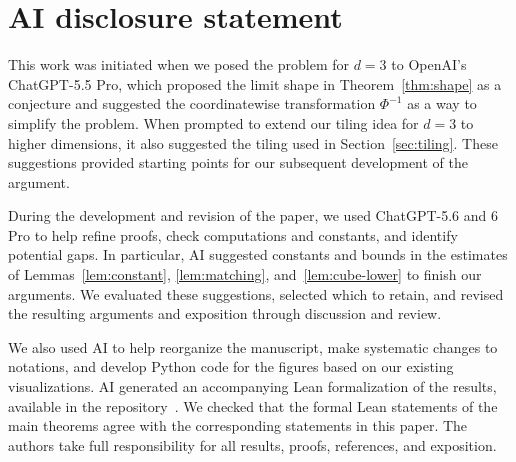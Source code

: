 \documentclass[11pt,letterpaper]{article}
\begin{document}
\section*{AI disclosure statement}\label{sec:ai}
This work was initiated when we posed the problem for $d=3$ to OpenAI's ChatGPT-5.5 Pro, which proposed the limit shape in Theorem~\ref{thm:shape} as a conjecture and suggested the coordinatewise transformation $\Phi^{-1}$ as a way to simplify the problem. When prompted to extend our tiling idea for $d=3$ to higher dimensions, it also suggested the tiling used in Section~\ref{sec:tiling}. These suggestions provided starting points for our subsequent development of the argument.

During the development and revision of the paper, we used ChatGPT-5.6 and 6 Pro to help refine proofs, check computations and constants, and identify potential gaps. In particular, AI suggested constants and bounds in the estimates of Lemmas~\ref{lem:constant}, \ref{lem:matching}, and~\ref{lem:cube-lower} to finish our arguments. We evaluated these suggestions, selected which to retain, and revised the resulting arguments and exposition through discussion and review.

We also used AI to help reorganize the manuscript, make systematic changes to notations, and develop Python code for the figures based on our existing visualizations. AI generated an accompanying Lean formalization of the results, available in the repository~\cite{antichain-lean}. We checked that the formal Lean statements of the main theorems agree with the corresponding statements in this paper. The authors take full responsibility for all results, proofs, references, and exposition.
\printbibliography
\end{document}
